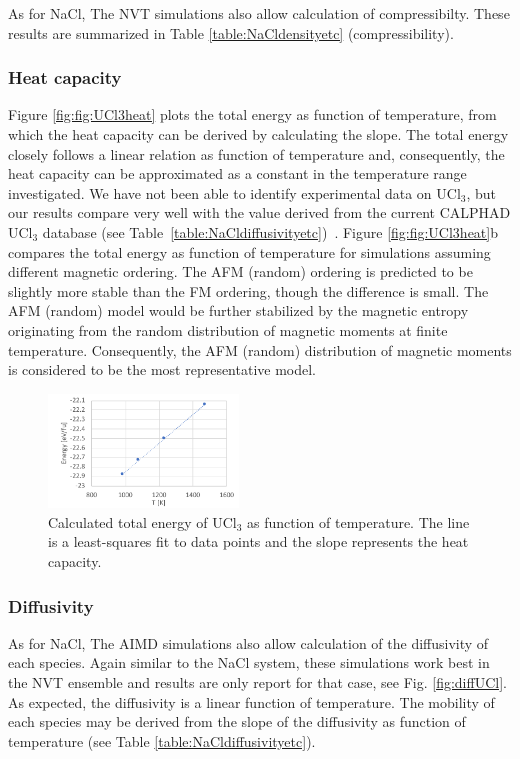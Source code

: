 \documentclass[preprint,3p,10pt,twocolumn,number,sort&compress]{elsarticle}
\begin{document}
As for NaCl, The NVT simulations also allow calculation of compressibilty. These results are  summarized in Table \ref{table:NaCldensityetc} (compressibility). %

\subsubsection{Heat capacity} 
Figure \ref{fig:fig:UCl3heat} plots the total energy as function of temperature, from which the heat capacity can be derived by calculating the slope. The total energy closely follows a linear relation as function of temperature and, consequently, the heat capacity can be approximated as a constant in the temperature range investigated. 
We have not been able to identify experimental data on UCl$_3$, but our results compare very well with the value derived from the current CALPHAD UCl$_3$ database (see Table~\ref{table:NaCldiffusivityetc})~\cite{}. Figure \ref{fig:fig:UCl3heat}b compares the total energy as function of temperature for simulations assuming different magnetic ordering. The AFM (random) ordering is predicted to be slightly more stable than the FM ordering, though the difference is small. The AFM (random) model would be further stabilized by the magnetic entropy originating from the random distribution of magnetic moments at finite temperature. Consequently, the AFM (random) distribution of magnetic moments is considered to be the most representative model. %

\begin{figure}[htb]
\centering
\includegraphics[width=0.45\textwidth]{./figures/FIG5.pdf}
\caption{Calculated total energy of UCl$_3$ as function of temperature. The line is a least-squares fit to data points and the slope represents the heat capacity.} 
\label{fig:UCl3heat}
\end{figure}

\subsubsection{Diffusivity}
As for NaCl, The AIMD simulations also allow calculation of the diffusivity of each species. Again similar to the NaCl system, these simulations work best in the NVT ensemble and results are only report for that case, see Fig. \ref{fig:diffUCl}. As expected, the diffusivity is a linear function of temperature. %
The mobility of each species may be derived from the slope of the diffusivity as function of temperature (see Table \ref{table:NaCldiffusivityetc}). 
\end{document}
